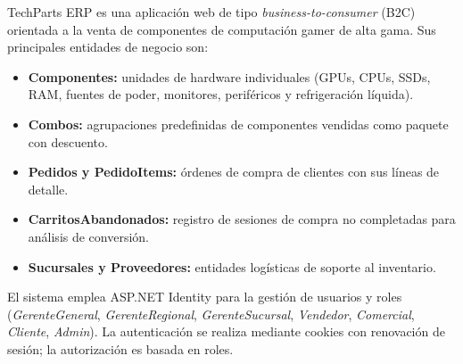 TechParts ERP es una aplicación web de tipo \textit{business-to-consumer} (B2C) orientada a la venta de componentes de computación gamer de alta gama.
Sus principales entidades de negocio son:

\begin{itemize}
  \item \textbf{Componentes:} unidades de hardware individuales (GPUs, CPUs, SSDs, RAM, fuentes de poder, monitores, periféricos y refrigeración líquida).
  \item \textbf{Combos:} agrupaciones predefinidas de componentes vendidas como paquete con descuento.
  \item \textbf{Pedidos y PedidoItems:} órdenes de compra de clientes con sus líneas de detalle.
  \item \textbf{CarritosAbandonados:} registro de sesiones de compra no completadas para análisis de conversión.
  \item \textbf{Sucursales y Proveedores:} entidades logísticas de soporte al inventario.
\end{itemize}

El sistema emplea ASP.NET Identity para la gestión de usuarios y roles (\textit{GerenteGeneral}, \textit{GerenteRegional}, \textit{GerenteSucursal}, \textit{Vendedor}, \textit{Comercial}, \textit{Cliente}, \textit{Admin}).
La autenticación se realiza mediante cookies con renovación de sesión; la autorización es basada en roles.
